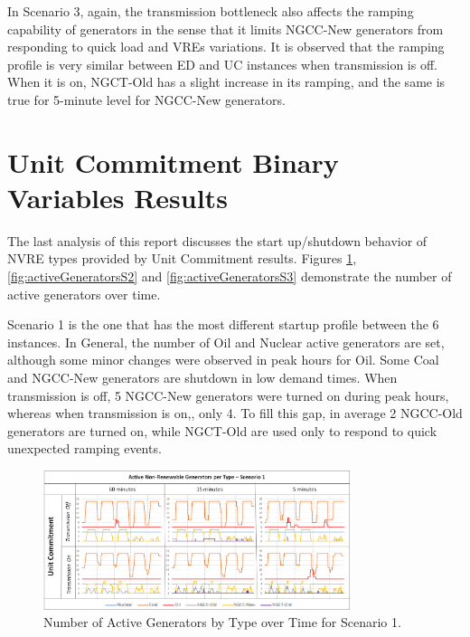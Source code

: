 \documentclass[12pt,LUDisStyle,twosided]{book}
\begin{document}
In Scenario 3, again, the transmission bottleneck also affects the ramping capability of generators in the sense that it limits NGCC-New generators from responding to quick load and VREs variations. It is observed that the ramping profile is very similar between ED and UC instances when transmission is off. When it is on, NGCT-Old has a slight increase in its ramping, and the same is true for 5-minute level for NGCC-New generators. 

\section{Unit Commitment Binary Variables Results} \label{section:uconoffstatus}

The last analysis of this report discusses the start up/shutdown behavior of NVRE types provided by Unit Commitment results. Figures \ref{fig:activeGeneratorsS1}, \ref{fig:activeGeneratorsS2} and \ref{fig:activeGeneratorsS3} demonstrate the number of active generators over time.

Scenario 1 is the one that has the most different startup profile between the 6 instances. In General, the number of Oil and Nuclear active generators are set, although some minor changes were observed in peak hours for Oil. Some Coal and NGCC-New generators are shutdown in low demand times. When transmission is off, 5 NGCC-New generators were turned on during peak hours, whereas when transmission is on,, only 4. To fill this gap, in average 2 NGCC-Old generators are turned on, while NGCT-Old are used only to respond to quick unexpected ramping events.

\begin{figure}[H] 
  \centering
  
	  \includegraphics[width=0.8\textwidth,keepaspectratio]{activeGeneratorsS1.png}
  
  \caption{Number of Active Generators by Type over Time for Scenario 1.}
  \label{fig:activeGeneratorsS1}
  \end{figure}
\end{document}
